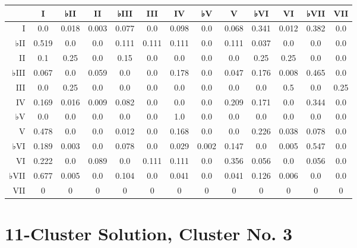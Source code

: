\begin{table}[htbp]
\begin{minipage}{\linewidth}
\setlength{\tymax}{0.5\linewidth}
\centering
\small
\begin{tabulary}{\textwidth}{@{}RCCCCCCCCCCCC@{}} \toprule
&I&♭II&II&♭III&III&IV&♭V&V&♭VI&VI&♭VII&VII\\
\midrule
I&0.0&0.018&0.003&0.077&0.0&0.098&0.0&0.068&0.341&0.012&0.382&0.0\\
♭II&0.519&0.0&0.0&0.111&0.111&0.111&0.0&0.111&0.037&0.0&0.0&0.0\\
II&0.1&0.25&0.0&0.15&0.0&0.0&0.0&0.0&0.25&0.25&0.0&0.0\\
♭III&0.067&0.0&0.059&0.0&0.0&0.178&0.0&0.047&0.176&0.008&0.465&0.0\\
III&0.0&0.25&0.0&0.0&0.0&0.0&0.0&0.0&0.0&0.5&0.0&0.25\\
IV&0.169&0.016&0.009&0.082&0.0&0.0&0.0&0.209&0.171&0.0&0.344&0.0\\
♭V&0.0&0.0&0.0&0.0&0.0&1.0&0.0&0.0&0.0&0.0&0.0&0.0\\
V&0.478&0.0&0.0&0.012&0.0&0.168&0.0&0.0&0.226&0.038&0.078&0.0\\
♭VI&0.189&0.003&0.0&0.078&0.0&0.029&0.002&0.147&0.0&0.005&0.547&0.0\\
VI&0.222&0.0&0.089&0.0&0.111&0.111&0.0&0.356&0.056&0.0&0.056&0.0\\
♭VII&0.677&0.005&0.0&0.104&0.0&0.041&0.0&0.041&0.126&0.006&0.0&0.0\\
VII&0&0&0&0&0&0&0&0&0&0&0&0\\

\bottomrule

\end{tabulary}
\end{minipage}
\end{table}

\section{11-Cluster Solution, Cluster No. 3}
\label{11-clustersolutionclusterno.3}

